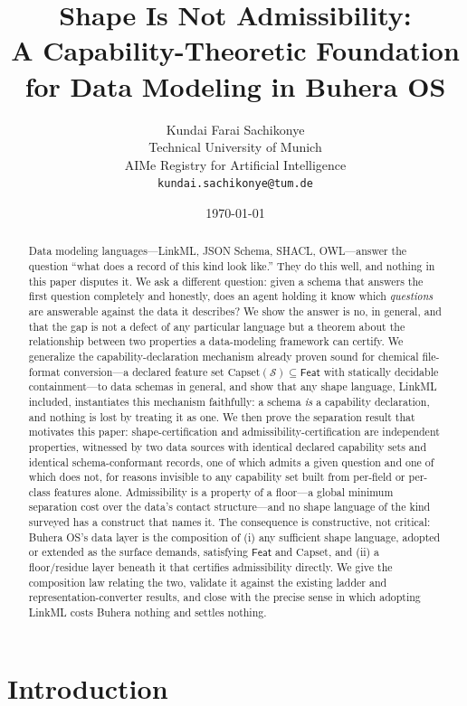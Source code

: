 \documentclass[11pt,a4paper,twocolumn]{article}
\title{Shape Is Not Admissibility:\\
A Capability-Theoretic Foundation for Data Modeling in Buhera OS}
\author{Kundai Farai Sachikonye\\
\small Technical University of Munich\\
\small AIMe Registry for Artificial Intelligence\\
\small \texttt{kundai.sachikonye@tum.de}}
\date{\today}
\theoremstyle{definition}
\theoremstyle{remark}
\newcommand{\Feat}{\mathsf{Feat}}
\newcommand{\Capset}{\mathrm{Capset}}
\newcommand{\Src}{\mathcal{S}}
\begin{document}
\maketitle

\begin{abstract}
Data modeling languages---LinkML, JSON Schema, SHACL, OWL---answer the question
``what does a record of this kind look like.'' They do this well, and nothing in
this paper disputes it. We ask a different question: given a schema that answers
the first question completely and honestly, does an agent holding it know which
\emph{questions} are answerable against the data it describes? We show the answer
is no, in general, and that the gap is not a defect of any particular language but
a theorem about the relationship between two properties a data-modeling framework
can certify. We generalize the capability-declaration mechanism already proven
sound for chemical file-format conversion---a declared feature set $\Capset(\Src)
\subseteq \Feat$ with statically decidable containment---to data schemas in
general, and show that any shape language, LinkML included, instantiates this
mechanism faithfully: a schema \emph{is} a capability declaration, and nothing is
lost by treating it as one. We then prove the separation result that motivates
this paper: shape-certification and admissibility-certification are independent
properties, witnessed by two data sources with identical declared capability sets
and identical schema-conformant records, one of which admits a given question and
one of which does not, for reasons invisible to any capability set built from
per-field or per-class features alone. Admissibility is a property of a floor---a
global minimum separation cost over the data's contact structure---and no shape
language of the kind surveyed has a construct that names it. The consequence is
constructive, not critical: Buhera OS's data layer is the composition of (i) any
sufficient shape language, adopted or extended as the surface demands, satisfying
$\Feat$ and $\Capset$, and (ii) a floor/residue layer beneath it that certifies
admissibility directly. We give the composition law relating the two, validate it
against the existing ladder and representation-converter results, and close with
the precise sense in which adopting LinkML costs Buhera nothing and settles
nothing.
\end{abstract}

\tableofcontents

\section{Introduction}
\label{sec:intro}
\end{document}

